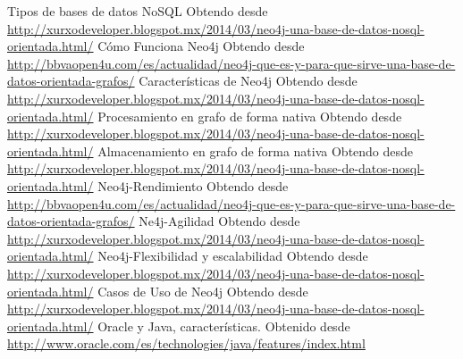 \begin{thebibliography}{1}
    Tipos de bases de datos NoSQL Obtendo desde \url{http://xurxodeveloper.blogspot.mx/2014/03/neo4j-una-base-de-datos-nosql-orientada.html/}	
    Cómo Funciona Neo4j Obtendo desde \url{http://bbvaopen4u.com/es/actualidad/neo4j-que-es-y-para-que-sirve-una-base-de-datos-orientada-grafos/}
    Características de Neo4j Obtendo desde \url{http://xurxodeveloper.blogspot.mx/2014/03/neo4j-una-base-de-datos-nosql-orientada.html/}	
    Procesamiento en grafo de forma nativa Obtendo desde \url{http://xurxodeveloper.blogspot.mx/2014/03/neo4j-una-base-de-datos-nosql-orientada.html/}	
    Almacenamiento en grafo de forma nativa Obtendo desde \url{http://xurxodeveloper.blogspot.mx/2014/03/neo4j-una-base-de-datos-nosql-orientada.html/}	
    Neo4j-Rendimiento Obtendo desde \url{http://bbvaopen4u.com/es/actualidad/neo4j-que-es-y-para-que-sirve-una-base-de-datos-orientada-grafos/}	
   	 Ne4j-Agilidad Obtendo desde \url{http://xurxodeveloper.blogspot.mx/2014/03/neo4j-una-base-de-datos-nosql-orientada.html/}	
    Neo4j-Flexibilidad y escalabilidad Obtendo desde \url{http://xurxodeveloper.blogspot.mx/2014/03/neo4j-una-base-de-datos-nosql-orientada.html/}
    Casos de Uso de Neo4j Obtendo desde \url{http://xurxodeveloper.blogspot.mx/2014/03/neo4j-una-base-de-datos-nosql-orientada.html/}	
    Oracle y Java, características. Obtenido desde \url{http://www.oracle.com/es/technologies/java/features/index.html}
\end{thebibliography}
